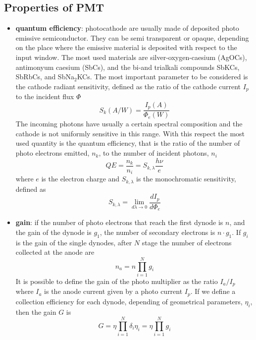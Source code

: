 \subsection{Properties of PMT}
\begin{itemize}
\item \textbf{quantum efficiency}: photocathode are usually made of deposited photo emissive semiconductor. They can be semi transparent or opaque, depending on the place where the emissive material is deposited with respect to the input window.
The most used materials are silver-oxygen-caesium (AgOCs), antimonyum caesium (SbCs), and the bi-and trialkali compounds SbKCs, SbRbCs, and SbNa$_{2}$KCs. The most important parameter to be considered is the cathode radiant sensitivity, defined as the ratio of the cathode current $I_{p}$ to the incident flux $\Phi$
\begin{equation}
S_{k}(A/W)=\frac{I_{p}(A)}{\Phi _{e}(W)}
\end{equation}
The incoming photons have usually a certain spectral composition and the cathode is not uniformly sensitive in this range. With this respect the most used quantity is the quantum efficiency, that is the ratio of the number of photo electrons emitted, $n_{k}$, to the number of incident photons, $n_{i}$
\begin{equation}
QE = \frac{n_{k}}{n_{i}} = S_{k, \lambda} \frac{h\nu}{e}
\end{equation}
where $e$ is the electron charge and $S_{k, \lambda}$ is the monochromatic sensitivity, defined as
\begin{equation}
S_{k, \lambda} = \lim_{d\lambda \to 0}\frac{dI_{p}}{d\Phi _{e}}
\end{equation}
\item \textbf{gain}: if the number of photo electrons that reach the first dynode is $n$, and the gain of the dynode is $g_{1}$, the number of secondary electrons is $n\cdot g_{1}$. If $g_{i}$ is the gain of the single dynodes, after $N$ stage the number of electrons collected at the anode are
\begin{equation}
n_{a} = n\prod_{i=1}^N g_i
\end{equation}
It is possible to define the gain of the photo multiplier as the ratio $I_{a}/I_{p}$ where $I_{a}$ is the anode current given by a photo current $I_{p}$. If we define a collection efficiency for each dynode, depending of geometrical parameters, $\eta _{i}$, then the gain $G$ is
\begin{equation}
G = \eta \prod_{i=1}^N \delta _{i} \eta _{i} = \eta \prod_{i=1}^N g_{i}

\end{equation}
\end{itemize}
